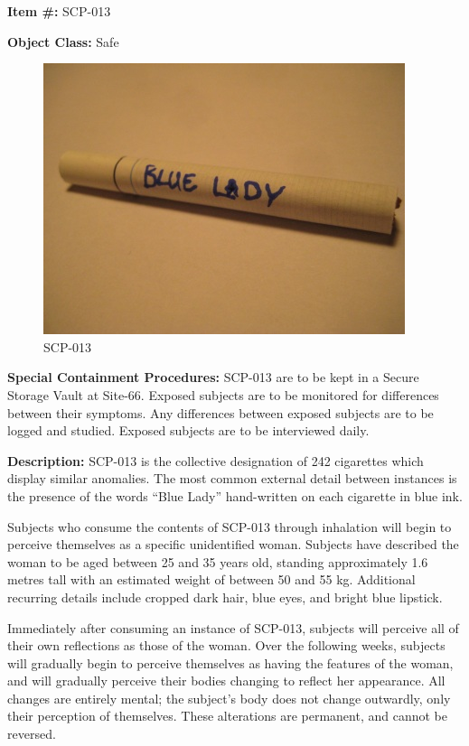 
\textbf{Item \#:} SCP-013

\textbf{Object Class:} Safe

\begin{figure}[h]
\begin{center}
\includegraphics[scale=1.4]{scp/013.jpg}
\linebreak SCP-013
\end{center}
\end{figure}

\textbf{Special Containment Procedures:} SCP-013 are to be kept in a Secure Storage Vault at Site-66. Exposed subjects are to be monitored for differences between their symptoms. Any differences between exposed subjects are to be logged and studied. Exposed subjects are to be interviewed daily.

\textbf{Description:} SCP-013 is the collective designation of 242 cigarettes which display similar anomalies. The most common external detail between instances is the presence of the words “Blue Lady” hand-written on each cigarette in blue ink.

Subjects who consume the contents of SCP-013 through inhalation will begin to perceive themselves as a specific unidentified woman. Subjects have described the woman to be aged between 25 and 35 years old, standing approximately 1.6 metres tall with an estimated weight of between 50 and 55 kg. Additional recurring details include cropped dark hair, blue eyes, and bright blue lipstick.

Immediately after consuming an instance of SCP-013, subjects will perceive all of their own reflections as those of the woman. Over the following weeks, subjects will gradually begin to perceive themselves as having the features of the woman, and will gradually perceive their bodies changing to reflect her appearance. All changes are entirely mental; the subject’s body does not change outwardly, only their perception of themselves. These alterations are permanent, and cannot be reversed.

